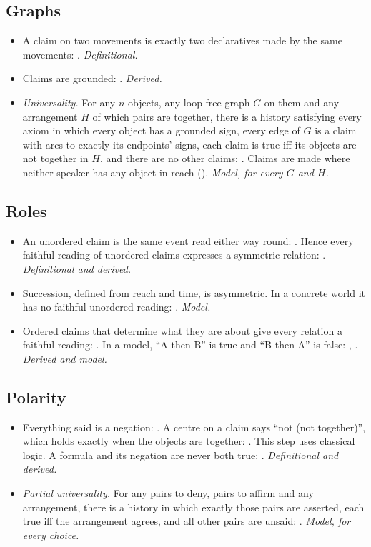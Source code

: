 \documentclass[11pt]{article}
\begin{document}
\subsection{Graphs}
\begin{itemize}
  \item A claim on two movements is exactly two declaratives made by the same movements:
    . \emph{Definitional.}
  \item Claims are grounded: . \emph{Derived.}
  \item \emph{Universality.} For any $n$ objects, any loop-free graph $G$ on them and any
    arrangement $H$ of which pairs are together, there is a history satisfying every axiom
    in which every object has a grounded sign, every edge of $G$ is a claim with arcs to
    exactly its endpoints' signs, each claim is true iff its objects are not together in
    $H$, and there are no other claims: . Claims are made where neither
    speaker has any object in reach (). \emph{Model, for every $G$ and
    $H$.}
\end{itemize}

\subsection{Roles}
\begin{itemize}
  \item An unordered claim is the same event read either way round: .
    Hence every faithful reading of unordered claims expresses a symmetric relation:
    . \emph{Definitional and derived.}
  \item Succession, defined from reach and time, is asymmetric. In a concrete world it has
    no faithful unordered reading: . \emph{Model.}
  \item Ordered claims that determine what they are about give every relation a faithful
    reading: . In a model, ``A then B'' is true and ``B then A'' is
    false: , . \emph{Derived and model.}
\end{itemize}

\subsection{Polarity}
\begin{itemize}
  \item Everything said is a negation: . A centre on a claim says ``not (not
    together)'', which holds exactly when the objects are together: . This
    step uses classical logic. A formula and its negation are never both true:
    . \emph{Definitional and derived.}
  \item \emph{Partial universality.} For any pairs to deny, pairs to affirm and any
    arrangement, there is a history in which exactly those pairs are asserted, each true iff
    the arrangement agrees, and all other pairs are unsaid: .
    \emph{Model, for every choice.}
\end{itemize}
\end{document}
